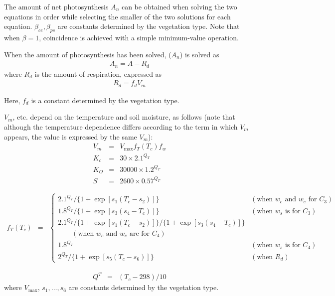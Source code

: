 The amount of net photosynthesis \(A_n\) can be obtained when solving the two equations in order while selecting the smaller of the two solutions for each equation. \(\beta_{ce}, \beta_{ps}\) are
constants determined by the vegetation type. Note that when \(\beta=1\), coincidence is achieved with a simple minimum-value operation.

When the amount of photosynthesis has been solved, (\(A_n\)) is solved as \begin{eqnarray}
 A_n = A - R_d
\end{eqnarray} where \(R_d\) is the amount of respiration, expressed as \begin{eqnarray}
 R_d = f_d V_m
\end{eqnarray}

Here, \(f_d\) is a constant determined by the vegetation type.

\(V_m\), etc. depend on the temperature and soil moisture, as follows (note that although the temperature dependence differs according to the term in which \(V_m\) appears, the value is expressed by
the same \(V_m\)): \begin{eqnarray}
 V_m &=& V_{\max} f_T(T_c) f_w \\
 K_c &=& 30 \times 2.1^{Q_T} \\
 K_O &=& 30000 \times 1.2^{Q_T} \\
 S   &=& 2600 \times 0.57^{Q_T}
\end{eqnarray}

\begin{eqnarray}
 f_T(T_c) &=& \left\{
\begin{array}{ll}
 2.1^{Q_T}/\{1 + \exp[s_1(T_c-s_2)]\} & (\text{when $w_c$ and $w_e$ for $C_3$})\\
 1.8^{Q_T}/\{1 + \exp[s_3(s_4-T_c)]\} & (\text{when $w_s$ is for $C_3$}) \\
 2.1^{Q_T}/\{1 + \exp[s_1(T_c-s_2)]\}/\{1 + \exp[s_3(s_4-T_c)]\} \\
                 \qquad   (\text{when $w_c$ and $w_e$ are for $C_4$})\\
 1.8^{Q_T}                            & (\text{when $w_s$ is for $C_4$}) \\
 2^{Q_T}/\{1 + \exp[s_5(T_c-s_6)]\}   & (\text{when $R_d$})
\end{array}
\right.
\end{eqnarray}

\begin{eqnarray}
Q^T &=& (T_c - 298) / 10
\end{eqnarray} where \(V_{\max}\), \(s_1, \ldots, s_6\) are constants determined by the vegetation type.

